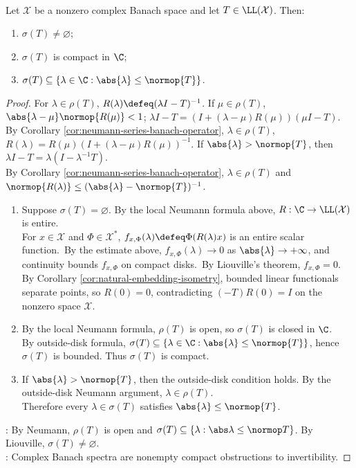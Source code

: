 \begin{theorem} \label{thm:spectrum-nonempty-compact-bounded-operator} \\
Let $\mathcal{X}$ be a nonzero complex Banach space and let $T\in\LL(\mathcal{X})$. Then:
\begin{enumerate}[label=(\roman*)]
\setlength{\itemsep}{0pt}
\item $\sigma(T)\neq\varnothing$;
\item $\sigma(T)$ is compact in $\C$;
\item $\sigma(T)\subseteq\{\lambda\in\C:\abs{\lambda}\leq\normop{T}\}$.
\end{enumerate}
\begin{proof} For $\lambda\in\rho(T)$, $R(\lambda)\defeq(\lambda I-T)^{-1}$. If $\mu\in\rho(T)$, $\abs{\lambda-\mu}\normop{R(\mu)}<1$; $\lambda I-T=(I+(\lambda-\mu)R(\mu))(\mu I-T)$.\\
By Corollary \ref{cor:neumann-series-banach-operator}, $\lambda\in\rho(T)$, $R(\lambda)=R(\mu)(I+(\lambda-\mu)R(\mu))^{-1}$. If $\abs{\lambda}>\normop{T}$, then $\lambda I-T=\lambda(I-\lambda^{-1}T)$.\\
By Corollary \ref{cor:neumann-series-banach-operator}, $\lambda\in\rho(T)$ and $\normop{R(\lambda)}\leq(\abs{\lambda}-\normop{T})^{-1}$.
\begin{enumerate}[label=(\roman*)]
\setlength{\itemsep}{0pt}
\item Suppose $\sigma(T)=\varnothing$. By the local Neumann formula above, $R:\C\to\LL(\mathcal{X})$ is entire.\\
For $x\in\mathcal{X}$ and $\Phi\in\mathcal{X}^*$, $f_{x,\Phi}(\lambda)\defeq\Phi(R(\lambda)x)$ is an entire scalar function.\
By the estimate above, $f_{x,\Phi}(\lambda)\to0$ as $\abs{\lambda}\to+\infty$, and continuity bounds $f_{x,\Phi}$ on compact disks.\
By Liouville's theorem, $f_{x,\Phi}=0$. By Corollary \ref{cor:natural-embedding-isometry}, bounded linear functionals separate points, so $R(0)=0$, contradicting $(-T)R(0)=I$ on the nonzero space $\mathcal{X}$.
\item By the local Neumann formula, $\rho(T)$ is open, so $\sigma(T)$ is closed in $\C$.\\
By outside-disk formula, $\sigma(T)\subseteq\{\lambda\in\C:\abs{\lambda}\leq\normop{T}\}$, hence $\sigma(T)$ is bounded. Thus $\sigma(T)$ is compact.
\item If $\abs{\lambda}>\normop{T}$, then the outside-disk condition holds. By the outside-disk Neumann argument, $\lambda\in\rho(T)$.\\
Therefore every $\lambda\in\sigma(T)$ satisfies $\abs{\lambda}\leq\normop{T}$.
\end{enumerate}
\hlt{Structural Commentary}: By Neumann, $\rho(T)$ is open and $\sigma(T)\subseteq\{\lambda:\abs\lambda\leq\normop T\}$. By Liouville, $\sigma(T)\neq\varnothing$.\\
: Complex Banach spectra are nonempty compact obstructions to invertibility.
\end{proof}
\end{theorem}


